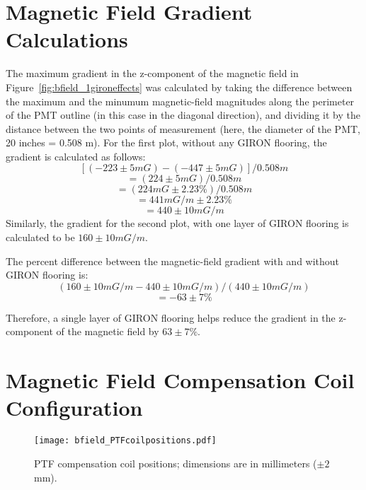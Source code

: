 
\appendix

\section{Magnetic Field Gradient Calculations}
\label{Appendix:MagneticFieldGradientCalculations}

The maximum gradient in the z-component of the magnetic field in Figure~\ref{fig:bfield_1gironeffects} was calculated by taking the difference between the maximum and the minumum magnetic-field magnitudes along the perimeter of the PMT outline (in this case in the diagonal direction), and dividing it by the distance between the two points of measurement (here, the diameter of the PMT, 20 inches = 0.508 m).
For the first plot, without any GIRON flooring, the gradient is calculated as follows:
\[[(-223\pm5 mG) - (-447\pm5 mG)]/0.508 m\]
\[=(224\pm5 mG)/0.508 m\]
\[=(224 mG \pm 2.23\%)/0.508 m\]
\[=441 mG/m \pm 2.23\%\]
\[=440 \pm 10 mG/m \]
Similarly, the gradient for the second plot, with one layer of GIRON flooring is calculated to be $ 160 \pm 10 mG/m $.

The percent difference between the magnetic-field gradient with and without GIRON flooring is:
\[(160\pm10 mG/m - 440\pm10 mG/m)/(440\pm10 mG/m)\]
\[=-63\pm7\%\]

Therefore, a single layer of GIRON flooring helps reduce the gradient in the z-component of the magnetic field by $ 63\pm7\% $.

\section{Magnetic Field Compensation Coil Configuration}
\label{Appendix:CoilPositions}
%
\begin{figure}[h]
  \begin{center}
  \texttt{[image: bfield\_PTFcoilpositions.pdf]}
  \caption{PTF compensation coil positions; dimensions are in millimeters ($\pm2$mm).}
  \label{fig:coilpos}
  \end{center}
\end{figure}
%
